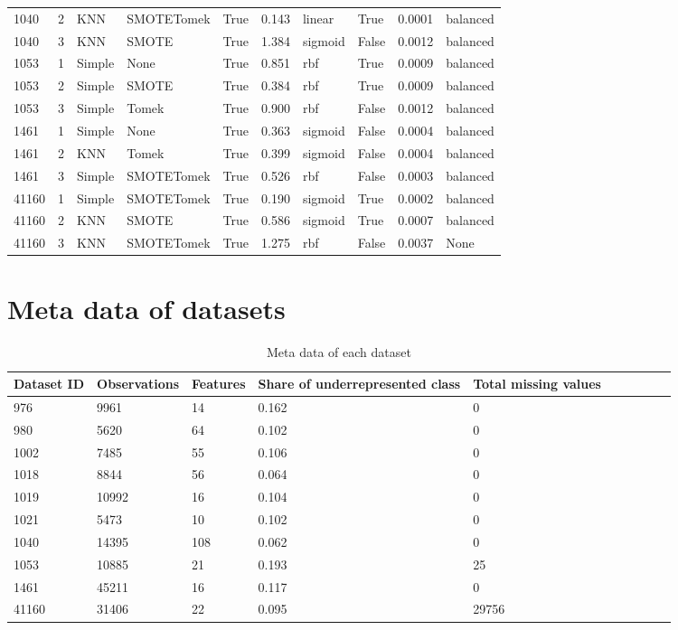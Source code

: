 \documentclass[11pt]{article}
\begin{document}
\begin{table}
\begin{tabular}{llllllllll}
1040 & 2 & KNN & SMOTETomek & True & 0.143 & linear & True & 0.0001 & balanced \\
1040 & 3 & KNN & SMOTE & True & 1.384 & sigmoid & False & 0.0012 & balanced \\
\midrule
1053 & 1 & Simple & None & True & 0.851 & rbf & True & 0.0009 & balanced \\
1053 & 2 & Simple & SMOTE & True & 0.384 & rbf & True & 0.0009 & balanced \\
1053 & 3 & Simple & Tomek & True & 0.900 & rbf & False & 0.0012 & balanced \\
\midrule
1461 & 1 & Simple & None & True & 0.363 & sigmoid & False & 0.0004 & balanced \\
1461 & 2 & KNN & Tomek & True & 0.399 & sigmoid & False & 0.0004 & balanced \\
1461 & 3 & Simple & SMOTETomek & True & 0.526 & rbf & False & 0.0003 & balanced \\
\midrule
41160 & 1 & Simple & SMOTETomek & True & 0.190 & sigmoid & True & 0.0002 & balanced \\
41160 & 2 & KNN & SMOTE & True & 0.586 & sigmoid & True & 0.0007 & balanced \\
41160 & 3 & KNN & SMOTETomek & True & 1.275 & rbf & False & 0.0037 & None \\
\bottomrule
\end{tabular}
\end{table}

\section{Meta data of datasets}

\begin{table}[H]
\center
\caption{Meta data of each dataset}
\begin{tabular}{llllllllll}
\toprule
Dataset ID & Observations & Features & Share of underrepresented class & Total missing values \\
\midrule
976 & 9961 & 14 & 0.162 & 0 \\
980 & 5620 & 64 & 0.102 & 0 \\
1002 & 7485 & 55 & 0.106 & 0 \\
1018 & 8844 & 56 & 0.064 & 0 \\
1019 & 10992 & 16 & 0.104 & 0 \\
1021 & 5473 & 10 & 0.102 & 0 \\
1040 & 14395 & 108 & 0.062 & 0 \\
1053 & 10885 & 21 & 0.193 & 25 \\
1461 & 45211 & 16 & 0.117 & 0 \\
41160 & 31406 & 22 & 0.095 & 29756 \\
\bottomrule
\end{tabular}
\end{table}
\end{document}
